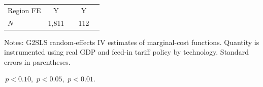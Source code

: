 \documentclass[12pt]{article}
\begin{document}
\begin{table}[!h]
\begin{threeparttable}
\begin{tabularx}{0.92\textwidth}{Xllllll}
\midrule
Region FE                    & \multicolumn{2}{c}{Y} && \multicolumn{2}{c}{Y} \\
$N$ & \multicolumn{2}{c}{1,811} && \multicolumn{2}{c}{112} \\
\bottomrule
\end{tabularx}

\begin{tablenotes}\footnotesize
\item Notes: G2SLS random-effects IV estimates of marginal-cost functions. Quantity is instrumented using real GDP and feed-in tariff policy by technology. Standard errors in parentheses.
\item \sym{*}\,$p<0.10$, \sym{**}\,$p<0.05$, \sym{***}\,$p<0.01$.
\end{tablenotes}
\end{threeparttable}
\end{table}
\end{document}
